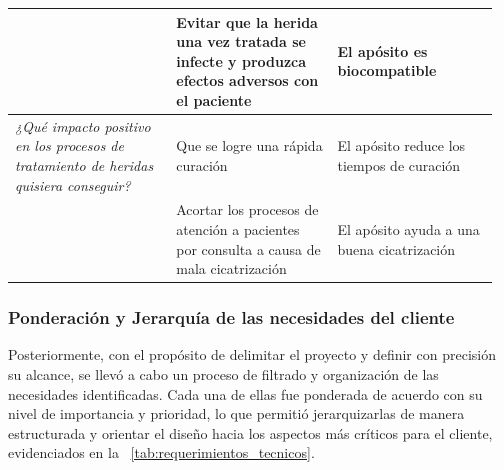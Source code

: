 \documentclass[../../DocumentoCompleto.tex]{subfiles}
\begin{document}
\begin{longtable}{p{0.32\linewidth} p{0.32\linewidth} p{0.32\linewidth}}
& Evitar que la herida una vez tratada se infecte y produzca efectos adversos con el paciente 
& El apósito es biocompatible \\

\midrule
\textit{¿Qué impacto positivo en los procesos de tratamiento de heridas quisiera conseguir?}
& Que se logre una rápida curación 
& El apósito reduce los tiempos de curación \\

& Acortar los procesos de atención a pacientes por consulta a causa de mala cicatrización 
& El apósito ayuda a una buena cicatrización \\
\end{longtable}






 \subsubsection*{Ponderación y Jerarquía de las necesidades del cliente}
Posteriormente, con el propósito de delimitar el proyecto y definir con precisión su alcance, se llevó a cabo un proceso de filtrado y organización de las necesidades identificadas. Cada una de ellas fue ponderada de acuerdo con su nivel de importancia y prioridad, lo que permitió jerarquizarlas de manera estructurada y orientar el diseño hacia los aspectos más críticos para el cliente, evidenciados en la \tablename~\ref{tab:requerimientos_tecnicos}.
\end{document}
